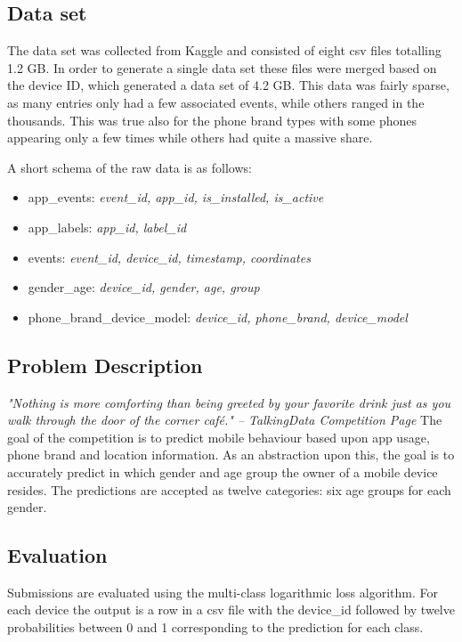 \documentclass[runningheads,a4paper]{llncs}
\begin{document}
\subsection{Data set}
The data set was collected from Kaggle and consisted of eight csv files totalling 1.2 GB. In order to generate a single data set these files were merged based on the device ID, which generated a data set of 4.2 GB. This data was fairly sparse, as many entries only had a few associated events, while others ranged in the thousands. This was true also for the phone brand types with some phones appearing only a few times while others had quite a massive share. 
\medskip

A short schema of the raw data is as follows:
\begin{itemize}
\item app\_events: \textit{event\_id, app\_id, is\_installed, is\_active}
\item app\_labels: \textit{app\_id, label\_id}
\item events: \textit{event\_id, device\_id, timestamp, coordinates}
\item gender\_age: \textit{device\_id, gender, age, group}
\item phone\_brand\_device\_model: \textit{device\_id, phone\_brand, device\_model}
\end{itemize}

\subsection{Problem Description}
\textit{"Nothing is more comforting than being greeted by your favorite drink just as you walk through the door of the corner café." -- TalkingData Competition Page } 
\smallskip
\newline
\noindent
The goal of the competition is to predict mobile behaviour based upon app usage, phone brand and location information. As an abstraction upon this, the goal is to accurately predict in which gender and age group the owner of a mobile device resides. The predictions are accepted as twelve categories: six age groups for each gender. 
\subsection{Evaluation}
Submissions are evaluated using the multi-class logarithmic loss algorithm. For each device the output is a row in a csv file with the device\_id followed by twelve probabilities between 0 and 1 corresponding to the prediction for each class.
\end{document}
